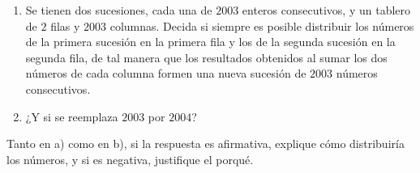  \begin{enumerate} 
   \item  Se tienen dos sucesiones, cada una de $2003$ enteros consecutivos, y un tablero de $2$ filas y $2003$ columnas. Decida si siempre es posible distribuir los números de la primera sucesión en la primera fila y los de la segunda sucesión en la segunda fila, de tal manera que los resultados obtenidos al sumar los dos números de cada columna formen una nueva sucesión de $2003$ números consecutivos.
   \item  ¿Y si se reemplaza $2003$ por $2004$?
 \end{enumerate} 
Tanto en a) como en b), si la respuesta es afirmativa, explique cómo distribuiría los números, y si es negativa, justifique el porqué.
